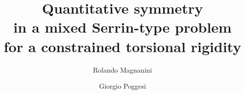 \documentclass[a4paper,10pt]{amsart}
\numberwithin{equation}{section}
\begin{document}
\newcommand{\core}{\heartsuit}
\newcommand{\diam}{\mathrm{diam}}


\newcommand{\lan}{\langle}
\newcommand{\ran}{\rangle}
\newcommand{\tr}{\mathop{\mathrm{tr}}}
\newcommand{\diag}{\mathop{\mathrm{diag}}}
\newcommand{\dv}{\mathop{\mathrm{div}}}

\newcommand{\al}{\alpha}
\newcommand{\be}{\beta}
\newcommand{\Om}{\Omega}
\newcommand{\na}{\nabla}

\newcommand{\cC}{\mathcal{C}}
\newcommand{\cM}{\mathcal{M}}
\newcommand{\nr}{\Vert}
\newcommand{\De}{\Delta}
\newcommand{\cX}{\mathcal{X}}
\newcommand{\cP}{\mathcal{P}}
\newcommand{\om}{\omega}
\newcommand{\si}{\sigma}
\newcommand{\te}{\theta}
\newcommand{\Ga}{\Gamma}

\newcommand{\loc}{\mathrm{loc}}

\newcommand{\ca}{\tilde{a}}
 


\title[Quantitative symmetry in a mixed 
Serrin-type problem]{Quantitative symmetry \\ in a mixed  
Serrin-type problem \\ for a constrained torsional rigidity}


\author{Rolando Magnanini} 
\address{Dipartimento di Matematica ed Informatica ``U.~Dini'',
Universit\` a di Firenze, viale Morgagni 67/A, 50134 Firenze, Italy.}



\author{Giorgio Poggesi}
\address{Department of Mathematics and Statistics, The University of Western Australia, 35 Stirling Highway, Crawley, Perth, WA 6009, Australia}
    


\end{document}
